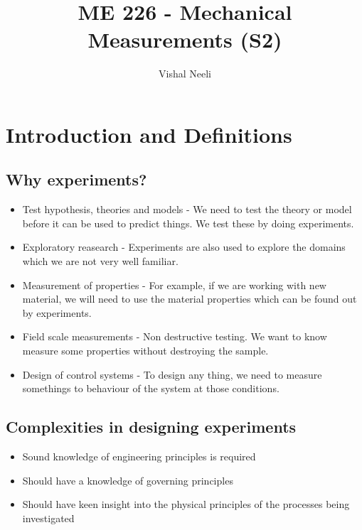 \documentclass{article}
\title{ME 226 - Mechanical Measurements (S2)}
\author{Vishal Neeli}
\begin{document}
\maketitle

\section{Introduction and Definitions}
	\subsection{Why experiments?}
		\begin{itemize}
			\item Test hypothesis, theories and models - We need to test the theory or model before it can be used to predict things. We test these by doing experiments.
			\item Exploratory reasearch - Experiments are also used to explore the domains which we are not very well familiar.
			\item Measurement of properties - For example, if we are working with new material, we will need to use the material properties which can be found out by experiments.
			\item Field scale measurements - Non destructive testing. We want to know measure some properties without destroying the sample.
			\item Design of control systems - To design any thing, we need to measure somethings to behaviour of the system at those conditions.
		\end{itemize}

	\subsection{Complexities in designing experiments}
		\begin{itemize}
			\item Sound knowledge of engineering principles is required
			\item Should have a knowledge of governing principles
			\item Should have keen insight into the physical principles of the processes being investigated
		\end{itemize}
\end{document}
